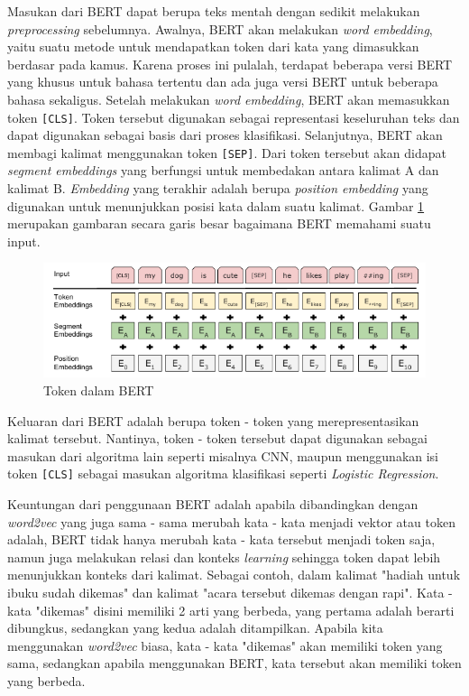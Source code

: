 Masukan dari BERT dapat berupa teks mentah dengan sedikit melakukan \textit{preprocessing} sebelumnya. Awalnya, BERT akan melakukan \textit{word embedding}, yaitu suatu metode untuk mendapatkan token dari kata yang dimasukkan berdasar pada kamus. Karena proses ini pulalah, terdapat beberapa versi BERT yang khusus untuk bahasa tertentu dan ada juga versi BERT untuk beberapa bahasa sekaligus. Setelah melakukan \textit{word embedding}, BERT akan memasukkan token \texttt{[CLS]}. Token tersebut digunakan sebagai representasi keseluruhan teks dan dapat digunakan sebagai basis dari proses klasifikasi. Selanjutnya, BERT akan membagi kalimat menggunakan token \texttt{[SEP]}. Dari token tersebut akan didapat \textit{segment embeddings} yang berfungsi untuk membedakan antara kalimat A dan kalimat B. \textit{Embedding} yang terakhir adalah berupa \textit{position embedding} yang digunakan untuk menunjukkan posisi kata dalam suatu kalimat. Gambar \ref{fig: bertToken} merupakan gambaran secara garis besar bagaimana BERT memahami suatu input.

\begin{figure}[h]
    \begin{center}
        \includegraphics[width= 0.9\linewidth]{gambar/bert.png}
        \caption{Token dalam BERT \cite{devlin2019bert}}
        \label{fig: bertToken}
    \end{center}
\end{figure}

Keluaran dari BERT adalah berupa token - token yang merepresentasikan kalimat tersebut. Nantinya, token - token tersebut dapat digunakan sebagai masukan dari algoritma lain seperti misalnya CNN, maupun menggunakan isi token \texttt{[CLS]} sebagai masukan algoritma klasifikasi seperti \textit{Logistic Regression}.

Keuntungan dari penggunaan BERT adalah apabila dibandingkan dengan \textit{word2vec} yang juga sama - sama merubah kata - kata menjadi vektor atau token adalah, BERT tidak hanya merubah kata - kata tersebut menjadi token saja, namun juga melakukan relasi dan konteks \textit{learning} sehingga token dapat lebih menunjukkan konteks dari kalimat. Sebagai contoh, dalam kalimat "hadiah untuk ibuku sudah dikemas" dan kalimat "acara tersebut dikemas dengan rapi". Kata - kata "dikemas" disini memiliki 2 arti yang berbeda, yang pertama adalah berarti dibungkus, sedangkan yang kedua adalah ditampilkan. Apabila kita menggunakan \textit{word2vec} biasa, kata - kata "dikemas" akan memiliki token yang sama, sedangkan apabila menggunakan BERT, kata tersebut akan memiliki token yang berbeda. \cite{coenen2019visualizing}

